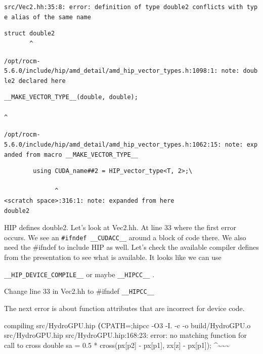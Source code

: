 \documentclass[
]{article}
\let\oldtexttt\texttt
\renewcommand{\texttt}[1]{
  \colorbox{Light}{\oldtexttt{#1}}
}
\newenvironment{Shaded}{}{}
\newcommand{\ExtensionTok}[1]{#1}
\newcommand{\KeywordTok}[1]{\textcolor[rgb]{0.00,0.44,0.13}{\textbf{#1}}}
\newcommand{\NormalTok}[1]{#1}
\newcommand{\StringTok}[1]{\textcolor[rgb]{0.25,0.44,0.63}{#1}}
\newcommand{\VariableTok}[1]{\textcolor[rgb]{0.10,0.09,0.49}{#1}}
\begin{document}
{\small
\texttt{src/Vec2.hh:35:8:\ error:\ definition\ of\ type\ \textquotesingle{}double2\textquotesingle{}\ conflicts\ with\ type\ alias\ of\ the\ same\ name}
}

\begin{verbatim}
struct double2
       ^
\end{verbatim}

{\small
\texttt{/opt/rocm-5.6.0/include/hip/amd\_detail/amd\_hip\_vector\_types.h:1098:1:\ note:\ \textquotesingle{}double2\textquotesingle{}\ declared\ here}
}

\begin{verbatim}
__MAKE_VECTOR_TYPE__(double, double);

^
\end{verbatim}

{\footnotesize
\texttt{/opt/rocm-5.6.0/include/hip/amd\_detail/amd\_hip\_vector\_types.h:1062:15:\ note:\ expanded\ from\ macro\ \textquotesingle{}\_\_MAKE\_VECTOR\_TYPE\_\_\textquotesingle{}}
}

\begin{verbatim}
        using CUDA_name##2 = HIP_vector_type<T, 2>;\

              ^
<scratch space>:316:1: note: expanded from here
double2
\end{verbatim}

HIP defines double2. Let's look at Vec2.hh. At line 33 where the first
error occurs. We see an \texttt{\#ifndef\ \_\_CUDACC\_\_} around a block
of code there. We also need the \#ifndef to include HIP as well. Let's
check the available compiler defines from the presentation to see what
is available. It looks like we can use
\texttt{\_\_HIP\_DEVICE\_COMPILE\_\_} or maybe \texttt{\_\_HIPCC\_\_}.

Change line 33 in Vec2.hh to \#ifndef \texttt{\_\_HIPCC\_\_}

The next error is about function attributes that are incorrect for
device code.

\begin{Shaded}
\begin{Highlighting}[]
\ExtensionTok{compiling}\NormalTok{ src/HydroGPU.hip}
\KeywordTok{(}\VariableTok{CPATH=}\NormalTok{;}\ExtensionTok{hipcc}\NormalTok{ {-}O3 {-}I.  {-}c {-}o build/HydroGPU.o src/HydroGPU.hip}
\ExtensionTok{src}\NormalTok{/HydroGPU.hip:}\ExtensionTok{168}\NormalTok{:23: error: no matching function for call to }\StringTok{\textquotesingle{}cross}
\StringTok{    double sa = 0.5 * cross(px[p2] {-} px[p1],  zx[z] {-} px[p1]);}
\StringTok{                      \^{}\textasciitilde{}\textasciitilde{}\textasciitilde{}}
\end{Highlighting}
\end{Shaded}
\end{document}
